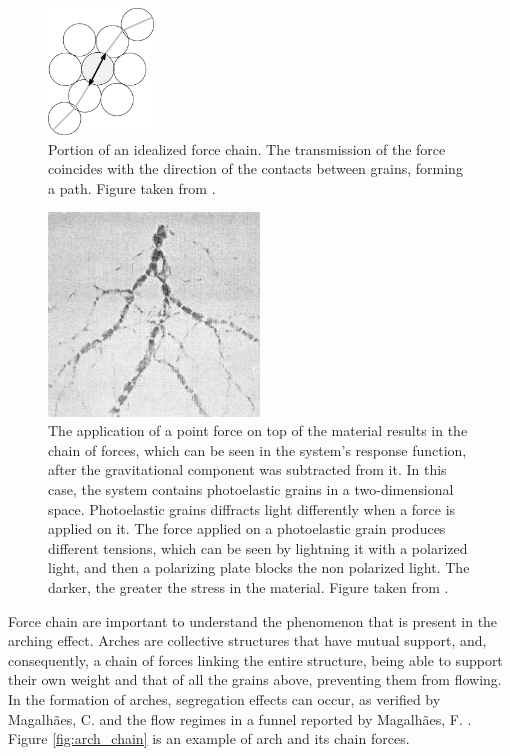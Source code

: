 \begin{figure}[H]
    \centering
    \includegraphics[width=0.25\textwidth]{04-figuras/Force_Chain_Pathway.png}
    \caption[Pahtway of force chain.]{Portion of an idealized force chain. The transmission of the force coincides with the direction of the contacts between grains, forming a path. Figure taken from \cite{Characterization_of_force_chains_in_granular_material}.}
    \label{fig:pathway_chain}
\end{figure}

\begin{figure}[H]
    \centering
    \includegraphics[width=0.5\textwidth]{04-figuras/Cadeia_Forca.png}
    \caption[Example of force chain.]{The application of a point force on top of the material results in the chain of forces, which can be seen in the system's response function, after the gravitational component was subtracted from it. In this case, the system contains photoelastic grains in a two-dimensional space. Photoelastic grains diffracts light differently when a force is applied on it. The force applied on a photoelastic grain produces different tensions, which can be seen by lightning it with a polarized light, and then a polarizing plate blocks the non polarized light. The darker, the greater the stress in the material. Figure taken from \cite{Sensitivity_of_Stress_Response_Function_to_Packing_Preparation}.}
    \label{fig:force_chain}
\end{figure}

    Force chain are important to understand the phenomenon that is present in the arching effect. Arches are collective structures that have mutual support, and, consequently, a chain of forces linking the entire structure, being able to support their own weight and that of all the grains above, preventing them from flowing. In the formation of arches, segregation effects can occur, as verified by Magalhães, C. \cite{Caio-Tese} and the flow regimes in a funnel reported by Magalhães, F. \cite{Felipe-Tese}. Figure \ref{fig:arch_chain} is an example of arch and its chain forces.


